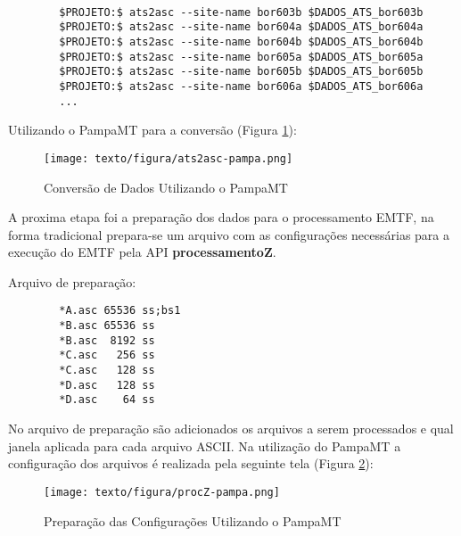     \begin{footnotesize}        
\begin{verbatim}

        $PROJETO:$ ats2asc --site-name bor603b $DADOS_ATS_bor603b
        $PROJETO:$ ats2asc --site-name bor604a $DADOS_ATS_bor604a
        $PROJETO:$ ats2asc --site-name bor604b $DADOS_ATS_bor604b
        $PROJETO:$ ats2asc --site-name bor605a $DADOS_ATS_bor605a
        $PROJETO:$ ats2asc --site-name bor605b $DADOS_ATS_bor605b
        $PROJETO:$ ats2asc --site-name bor606a $DADOS_ATS_bor606a
        ...
\end{verbatim}
\end{footnotesize}

    Utilizando o PampaMT para a conversão (Figura \ref{ats2asc-pampa}):
    
    \begin{figure}[H]
        \caption{Conversão de Dados Utilizando o PampaMT}
            \begin{center}
                \texttt{[image: texto/figura/ats2asc-pampa.png]}
            \end{center}
        \legend{\Fonte{\oautor}}
        \label{ats2asc-pampa}
    \end{figure}
    
    A proxima etapa foi a preparação dos dados para o processamento EMTF, na forma tradicional prepara-se um arquivo com as configurações necessárias para a execução do EMTF pela API \textbf{processamentoZ}.
    
    Arquivo de preparação:
    
\begin{footnotesize}        
\begin{verbatim}
        *A.asc 65536 ss;bs1
        *B.asc 65536 ss
        *B.asc  8192 ss
        *C.asc   256 ss
        *C.asc   128 ss
        *D.asc   128 ss
        *D.asc    64 ss
\end{verbatim}
\end{footnotesize}
    
    No arquivo de preparação são adicionados os arquivos a serem processados e qual janela aplicada para cada arquivo ASCII. Na utilização do PampaMT a configuração dos arquivos é realizada pela seguinte tela (Figura \ref{procZ-pampa}):
    
    \begin{figure}[H]
        \caption{Preparação das Configurações Utilizando o PampaMT}
            \begin{center}
                \texttt{[image: texto/figura/procZ-pampa.png]}
            \end{center}
        \legend{\Fonte{\oautor}}
        \label{procZ-pampa}
    \end{figure}
    

